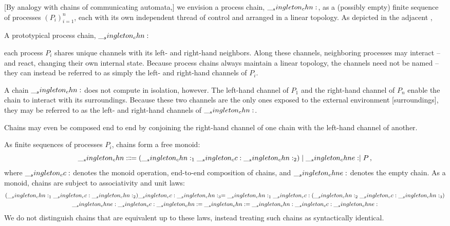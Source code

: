 [By analogy with chains of communicating automata,] we envision a process chain, $\__singleton_chn:$, as a (possibly empty) finite sequence of processes $(P_i)_{i=1}^{n}$, each with its own independent thread of control and arranged in a linear topology.
As depicted in the adjacent ,%
%
\begin{marginfigure}
  \centering
  \caption{A prototypical process chain, $\__singleton_chn:$}\label{fig:singleton-processes:chain-topology}
\end{marginfigure}
%
each process $P_i$ shares unique channels with its left- and right-hand neighbors.
Along these channels, neighboring processes may interact -- and react, changing their own internal state.
Because process chains always maintain a linear topology, the channels need not be named -- they can instead be referred to as simply the left- and right-hand channels of $P_i$.

A chain $\__singleton_chn:$ does not compute in isolation, however.
The left-hand channel of $P_1$ and the right-hand channel of $P_n$ enable the chain to interact with its surroundings.
Because these two channels are the only ones exposed to the external environment [surroundings], they may be referred to as the left- and right-hand channels of $\__singleton_chn:$.

Chains may even be composed end to end by conjoining the right-hand channel of one chain with the left-hand channel of another.

As finite sequences of processes $P_i$, chains form a free monoid:
\begin{equation*}
  \__singleton_chn: \Coloneqq (\__singleton_chn:_1 \__singleton_cc: \__singleton_chn:_2) \mid \__singleton_chne: \mid P
  \,,
\end{equation*}
where $\__singleton_cc:$ denotes the monoid operation, end-to-end composition of chains, and $\__singleton_chne:$ denotes the empty chain.
As a monoid, chains are subject to associativity and unit laws:
\begin{gather*}
  (\__singleton_chn:_1 \__singleton_cc: \__singleton_chn:_2) \__singleton_cc: \__singleton_chn:_3 = \__singleton_chn:_1 \__singleton_cc: (\__singleton_chn:_2 \__singleton_cc: \__singleton_chn:_3) \\
  \__singleton_chne: \__singleton_cc: \__singleton_chn: = \__singleton_chn: = \__singleton_chn: \__singleton_cc: \__singleton_chne:
\end{gather*}
We do not distinguish chains that are equivalent up to these laws, instead treating such chains as syntactically identical.


